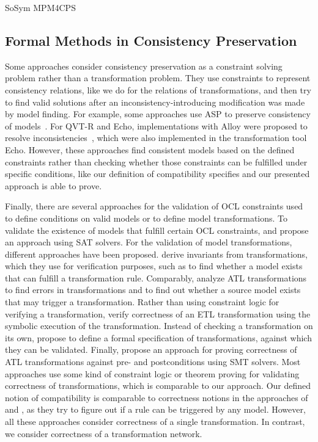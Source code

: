 \begin{copiedFrom}{SoSym MPM4CPS}
\subsection*{Formal Methods in Consistency Preservation}
Some approaches consider consistency preservation as a constraint solving problem rather than a transformation problem.
They use constraints to represent consistency relations, like we do for the relations of transformations, and then try to find valid solutions after an inconsistency-introducing modification was made by model finding.
For example, some approaches use \gls{ASP} to preserve consistency of models~\cite{cicchetti2006a, eramo2008a}.
For QVT-R and Echo, implementations with Alloy were proposed to resolve inconsistencies~\cite{macedo2013a,macedo2016alloy}, which were also implemented in the transformation tool Echo.
However, these approaches find consistent models based on the defined constraints rather than checking whether those constraints can be fulfilled under specific conditions, like our definition of compatibility specifies and our presented approach is able to prove.

Finally, there are several approaches for the validation of OCL constraints used to define conditions on valid models or to define model transformations.
To validate the existence of models that fulfill certain OCL constraints, %
\textcite{kuhlmann2011a} and \textcite{gonzalez2012a} propose an approach using SAT solvers.
For the validation of model transformations, different approaches have been proposed.
\textcite{cabot2010VerificationInvariants-JSS} derive invariants from transformations, which they use for verification purposes, such as to find whether a model exists that can fulfill a transformation rule.
Comparably, \textcite{cuadrado2017tse} analyze ATL transformations to find errors in transformations and to find out whether a source model exists that may trigger a transformation.
Rather than using constraint logic for verifying a transformation, \textcite{azizi2017ContractVerification-ICCKE} verify correctness of an ETL transformation using the symbolic execution of the transformation.
Instead of checking a transformation on its own, \textcite{vallecillo2012FormalTesting-FMMDE} propose to define a formal specification of transformations, against which they can be validated.
Finally, \textcite{buettner2012models} propose an approach for proving correctness of ATL transformations against pre- and postconditions using SMT solvers.
Most approaches use some kind of constraint logic or theorem proving for validating correctness of transformations, which is comparable to our approach.
Our defined notion of compatibility is comparable to correctness notions in the approaches of \textcite{cuadrado2017tse} and \textcite{cabot2010VerificationInvariants-JSS}, as they try to figure out if a rule can be triggered by any model.
However, all these approaches consider correctness of a single transformation.
In contrast, we consider correctness of a transformation network.



\end{copiedFrom}
